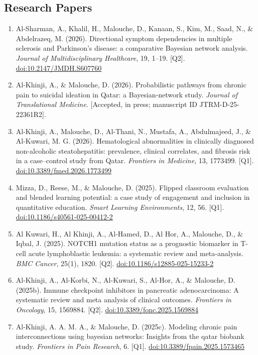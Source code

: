 \documentclass[11pt,a4paper,sans]{moderncv}
\begin{document}
\subsection{Research Papers}
\begin{enumerate}
\item Al-Sharman, A., Khalil, H., Malouche, D., Kanaan, S., Kim, M., Saad, N., \& Abdelrazeq, M. (2026). Directional symptom dependencies in multiple sclerosis and Parkinson's disease: a comparative Bayesian network analysis. \textit{Journal of Multidisciplinary Healthcare}, 19, 1--19. [Q2]. \href{https://doi.org/10.2147/JMDH.S607760}{doi:10.2147/JMDH.S607760}
\item Al-Khinji, A., \& Malouche, D. (2026). Probabilistic pathways from chronic pain to suicidal ideation in Qatar: a Bayesian-network study. \textit{Journal of Translational Medicine}. [Accepted, in press; manuscript ID JTRM-D-25-22361R2].
\item Al-Khinji, A., Malouche, D., Al-Thani, N., Mustafa, A., Abdulmajeed, J., \& Al-Kuwari, M. G. (2026). Hematological abnormalities in clinically diagnosed non-alcoholic steatohepatitis: prevalence, clinical correlates, and fibrosis risk in a case--control study from Qatar. \textit{Frontiers in Medicine}, 13, 1773499. [Q1]. \href{https://doi.org/10.3389/fmed.2026.1773499}{doi:10.3389/fmed.2026.1773499}
\item Mizza, D., Reese, M., \& Malouche, D. (2025). Flipped classroom evaluation and blended learning potential: a case study of engagement and inclusion in quantitative education. \textit{Smart Learning Environments}, 12, 56. [Q1]. \href{https://doi.org/10.1186/s40561-025-00412-2}{doi:10.1186/s40561-025-00412-2}
\item Al Kuwari, H., Al Khinji, A., Al-Hamed, D., Al Hor, A., Malouche, D., \& Iqbal, J. (2025). NOTCH1 mutation status as a prognostic biomarker in T-cell acute lymphoblastic leukemia: a systematic review and meta-analysis. \textit{BMC Cancer}, 25(1), 1820. [Q2]. \href{https://doi.org/10.1186/s12885-025-15233-2}{doi:10.1186/s12885-025-15233-2}
\item Al-Khinji, A., Al-Korbi, N., Al-Kuwari, S., Al-Hor, A., \& Malouche, D. (2025b). Immune checkpoint inhibitors in pancreatic adenocarcinoma: A systematic review and meta analysis of clinical outcomes. \textit{Frontiers in Oncology}, 15, 1569884. [Q2]. \href{https://doi.org/10.3389/fonc.2025.1569884}{doi:10.3389/fonc.2025.1569884}
\item Al-Khinji, A. A. M. A., \& Malouche, D. (2025c). Modeling chronic pain interconnections using bayesian networks: Insights from the qatar biobank study. \textit{Frontiers in Pain Research}, 6. [Q1]. \href{https://doi.org/10.3389/fpain.2025.1573465}{doi:10.3389/fpain.2025.1573465}

\end{enumerate}
\end{document}
